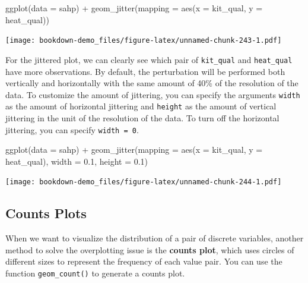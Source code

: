 \documentclass[
]{book}
\newenvironment{Shaded}{\begin{snugshade}}{\end{snugshade}}
\newcommand{\AttributeTok}[1]{\textcolor[rgb]{0.77,0.63,0.00}{#1}}
\newcommand{\FloatTok}[1]{\textcolor[rgb]{0.00,0.00,0.81}{#1}}
\newcommand{\FunctionTok}[1]{\textcolor[rgb]{0.00,0.00,0.00}{#1}}
\newcommand{\NormalTok}[1]{#1}
\newcommand{\SpecialCharTok}[1]{\textcolor[rgb]{0.00,0.00,0.00}{#1}}
\begin{document}
\begin{Shaded}
\begin{Highlighting}[]
\FunctionTok{ggplot}\NormalTok{(}\AttributeTok{data =}\NormalTok{ sahp) }\SpecialCharTok{+} \FunctionTok{geom\_jitter}\NormalTok{(}\AttributeTok{mapping =} \FunctionTok{aes}\NormalTok{(}\AttributeTok{x =}\NormalTok{ kit\_qual, }\AttributeTok{y =}\NormalTok{ heat\_qual))}
\end{Highlighting}
\end{Shaded}

\texttt{[image: bookdown-demo\_files/figure-latex/unnamed-chunk-243-1.pdf]}

For the jittered plot, we can clearly see which pair of \texttt{kit\_qual} and \texttt{heat\_qual} have more observations. By default, the perturbation will be performed both vertically and horizontally with the same amount of 40\% of the resolution of the data. To customize the amount of jittering, you can specify the arguments \texttt{width} as the amount of horizontal jittering and \texttt{height} as the amount of vertical jittering in the unit of the resolution of the data. To turn off the horizontal jittering, you can specify \texttt{width\ =\ 0}.

\begin{Shaded}
\begin{Highlighting}[]
\FunctionTok{ggplot}\NormalTok{(}\AttributeTok{data =}\NormalTok{ sahp) }\SpecialCharTok{+} \FunctionTok{geom\_jitter}\NormalTok{(}\AttributeTok{mapping =} \FunctionTok{aes}\NormalTok{(}\AttributeTok{x =}\NormalTok{ kit\_qual, }\AttributeTok{y =}\NormalTok{ heat\_qual),  }\AttributeTok{width =} \FloatTok{0.1}\NormalTok{, }\AttributeTok{height =} \FloatTok{0.1}\NormalTok{)}
\end{Highlighting}
\end{Shaded}

\texttt{[image: bookdown-demo\_files/figure-latex/unnamed-chunk-244-1.pdf]}

\hypertarget{counts-plots}{%
\subsection{Counts Plots}\label{counts-plots}}

When we want to visualize the distribution of a pair of discrete variables, another method to solve the overplotting issue is the \textbf{counts plot}, which uses circles of different sizes to represent the frequency of each value pair. You can use the function \texttt{geom\_count()} to generate a counts plot.
\end{document}
